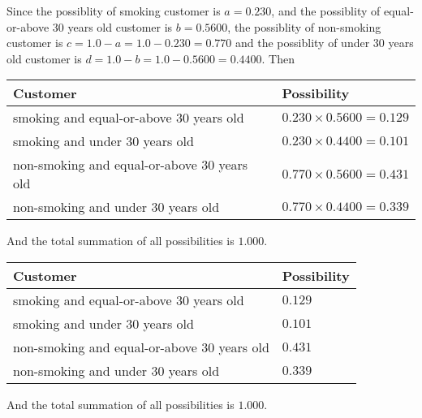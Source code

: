 \documentclass[12pt]{article}
\begin{document}
 

Since the possiblity of  %
smoking customer is $ a =  %
0.230 $,
and the possiblity of  %
equal-or-above 30 years old customer is $ b =  %
0.5600 $,
the possiblity of  %
non-smoking customer is $ c = 1.0 - a = 1.0 -
0.230
=  %
0.770 $ and the possiblity of  %
under 30 years old
customer is $ d = 1.0 - b = 1.0 -  %
0.5600 =  %
0.4400  $.
Then
 
\noindent
\begin{tabular}{|l|l|}
\hline
Customer & Possibility \\
\hline
smoking  and  %
equal-or-above 30 years old  &
  $ %
0.230 \times  %
0.5600 =  %
0.129$ \\
\hline
smoking  and  %
under 30 years old &
  $ %
0.230 \times  %
0.4400 =  %
0.101$ \\
\hline
 non-smoking and  %
equal-or-above 30 years old  &
  $ %
0.770 \times  %
0.5600 =  %
0.431$ \\
\hline
 non-smoking and  %
under 30 years old &
  $ %
0.770 \times  %
0.4400 =  %
0.339$ \\
\hline
\end{tabular}
 
\noindent
And the total summation of all possibilities is $  %
1.000 $.
 
 
 
 
\noindent{}
 
 

 
 
 
\noindent{}
 
 

 
\noindent
\begin{tabular}{|l|l|}
\hline
Customer & Possibility \\
\hline
smoking  and  %
equal-or-above 30 years old &
  $ %
0.129$ \\
\hline
smoking  and  %
under 30 years old &
  $ %
0.101$ \\
\hline
 non-smoking and  %
equal-or-above 30 years old &
  $ %
0.431$ \\
\hline
 non-smoking and  %
under 30 years old &
  $ %
0.339$ \\
\hline
\end{tabular}
 
\noindent
 And the total summation of all possibilities is $  %
1.000 $.
 
\end{document}
